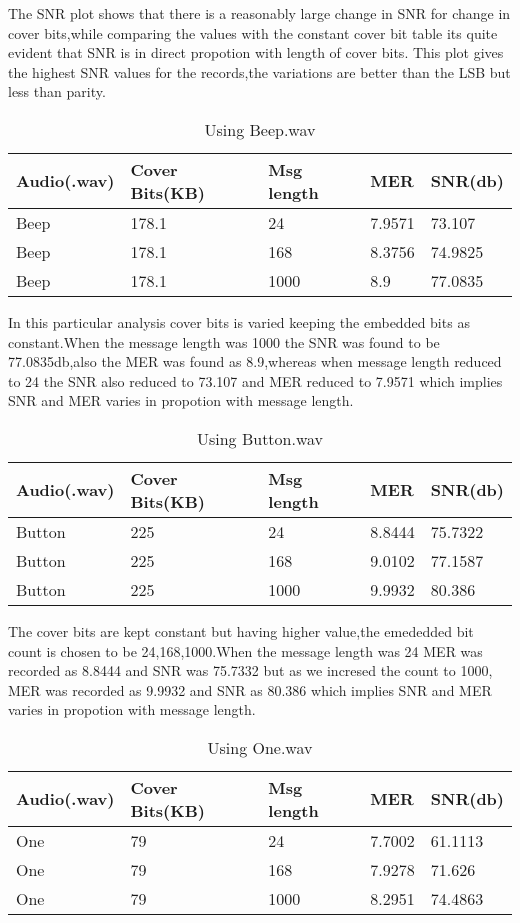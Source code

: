 \documentclass[a4paper, 12pt, notitlepage]{report}
\begin{document}
The SNR plot shows that there is a reasonably large change in SNR for change in cover bits,while comparing the values with the constant cover bit table its quite evident that SNR is in direct propotion with length of cover bits. This plot gives the highest SNR values for the records,the variations are better than the LSB but less than parity.

\begin{table}[h]
\begin{tabular}{|l|l|l|l|l|}
\hline
\textbf{ Audio(.wav)}&\textbf{Cover Bits(KB)}&\textbf{Msg length}&\textbf{MER}&\textbf{SNR(db)} \\ \hline
 Beep&178.1  &24  &7.9571  &73.107  \\ \hline
 Beep&178.1  &168  &8.3756  &74.9825  \\ \hline
 Beep&178.1  &1000  &8.9  &77.0835  \\ \hline
\end{tabular}
\caption{Using Beep.wav}
\end{table}

In this particular analysis cover bits is varied keeping the embedded bits as constant.When the message length was 1000 the SNR was found to be 77.0835db,also the MER was found as 8.9,whereas when message length reduced to 24 the SNR also reduced to 73.107 and MER reduced to 7.9571 which implies SNR and MER varies in propotion with message length.  

\begin{table}[h]
\begin{tabular}{|l|l|l|l|l|}
\hline
\textbf{ Audio(.wav)}&\textbf{Cover Bits(KB)}&\textbf{Msg length}&\textbf{MER}&\textbf{SNR(db)} \\ \hline
 Button&225  &24  &8.8444  &75.7322  \\ \hline
 Button&225  &168  &9.0102  &77.1587  \\ \hline
 Button&225  &1000  &9.9932  &80.386  \\ \hline
\end{tabular}
\caption{Using Button.wav}
\end{table}

The cover bits are kept constant but having higher value,the emededded bit count is chosen to be 24,168,1000.When the message length was 24 MER was recorded as 8.8444 and SNR was 75.7332 but as we incresed the count to 1000, MER was recorded as 9.9932 and SNR as 80.386 which implies SNR and MER varies in propotion with message length.

\begin{table}[h]
\begin{tabular}{|l|l|l|l|l|}
\hline
\textbf{ Audio(.wav)}&\textbf{Cover Bits(KB)}&\textbf{Msg length}&\textbf{MER}&\textbf{SNR(db)} \\ \hline
 One&79  &24  &7.7002  &61.1113  \\ \hline
 One&79  &168  &7.9278  &71.626  \\ \hline
 One&79  &1000  &8.2951  &74.4863  \\ \hline
\end{tabular}
\caption{Using One.wav}
\end{table}
\end{document}
